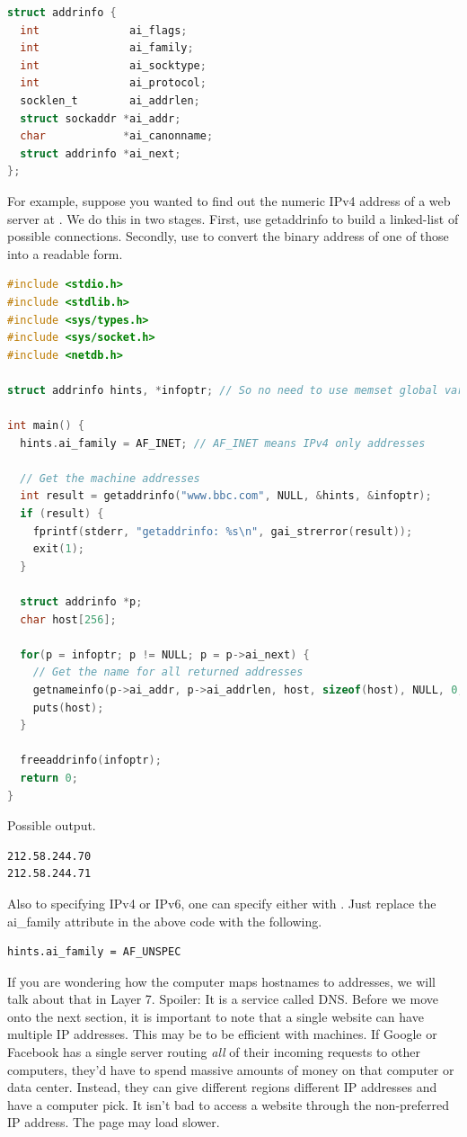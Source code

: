 \begin{lstlisting}[language=C]
struct addrinfo {
  int              ai_flags;
  int              ai_family;
  int              ai_socktype;
  int              ai_protocol;
  socklen_t        ai_addrlen;
  struct sockaddr *ai_addr;
  char            *ai_canonname;
  struct addrinfo *ai_next;
};
\end{lstlisting}

For example, suppose you wanted to find out the numeric IPv4 address of a web server at .
We do this in two stages.
First, use getaddrinfo to build a linked-list of possible connections.
Secondly, use  to convert the binary address of one of those into a readable form.

\begin{lstlisting}[language=C]
#include <stdio.h>
#include <stdlib.h>
#include <sys/types.h>
#include <sys/socket.h>
#include <netdb.h>

struct addrinfo hints, *infoptr; // So no need to use memset global variables

int main() {
  hints.ai_family = AF_INET; // AF_INET means IPv4 only addresses

  // Get the machine addresses
  int result = getaddrinfo("www.bbc.com", NULL, &hints, &infoptr);
  if (result) {
    fprintf(stderr, "getaddrinfo: %s\n", gai_strerror(result));
    exit(1);
  }

  struct addrinfo *p;
  char host[256];

  for(p = infoptr; p != NULL; p = p->ai_next) {
    // Get the name for all returned addresses
    getnameinfo(p->ai_addr, p->ai_addrlen, host, sizeof(host), NULL, 0, NI_NUMERICHOST);
    puts(host);
  }

  freeaddrinfo(infoptr);
  return 0;
}
\end{lstlisting}

Possible output.

\begin{lstlisting}
212.58.244.70
212.58.244.71
\end{lstlisting}

Also to specifying IPv4 or IPv6, one can specify either with .
Just replace the ai\_family attribute in the above code with the following.

\begin{lstlisting}
hints.ai_family = AF_UNSPEC
\end{lstlisting}

If you are wondering how the computer maps \gls{hostnames} to addresses, we will talk about that in Layer 7.
Spoiler: It is a service called \gls{DNS}.
Before we move onto the next section, it is important to note that a single website can have multiple IP addresses.
This may be to be efficient with machines.
If Google or Facebook has a single server routing \textit{all} of their incoming requests to other computers, they'd have to spend massive amounts of money on that computer or data center.
Instead, they can give different regions different IP addresses and have a computer pick.
It isn't bad to access a website through the non-preferred IP address.
The page may load slower.

